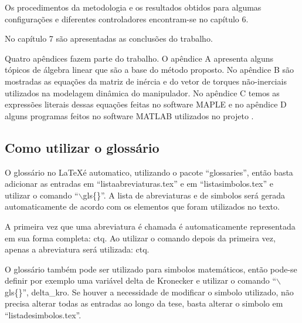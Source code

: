 Os procedimentos da metodologia e os resultados obtidos para algumas configurações e diferentes controladores encontram-se no capítulo 6.

No capítulo 7 são apresentadas as conclusões do trabalho.

Quatro apêndices fazem parte do trabalho. O apêndice A apresenta alguns tópicos de álgebra linear que são a base do método proposto. No apêndice B são mostradas as equações da matriz de inércia e do vetor de torques não-inerciais
utilizados na modelagem dinâmica do manipulador. No apêndice C temos as expressões literais dessas equações feitas no software MAPLE e no apêndice D alguns programas feitos no software MATLAB utilizados no projeto \cite{Furmento1995, Morgado2003}.


\subsection{Como utilizar o glossário}
O glossário no \LaTeX é automatico, utilizando o pacote ``glossaries'', então basta adicionar as entradas em ``listaabreviaturas.tex'' e em ``listasimbolos.tex'' e utilizar o comando ``$\backslash$gls\{\}''.
A lista de abreviaturas e de simbolos será gerada automaticamente de acordo com os elementos que foram utilizados no texto.

A primeira vez que uma abreviatura é chamada é automaticamente representada em sua forma completa: \gls{ctq}.
Ao utilizar o comando depois da primeira vez, apenas a abreviatura será utilizada: \gls{ctq}.

O glossário também pode ser utilizado para simbolos matemáticos, então pode-se definir por exemplo uma variável delta de Kronecker e utilizar o comando ``$\backslash$gls\{\}'', \gls{delta_kro}. 
Se houver a necessidade de modificar o simbolo utilizado, não precisa alterar todas as entradas ao longo da tese, basta alterar o simbolo em ``listadesimbolos.tex''.


